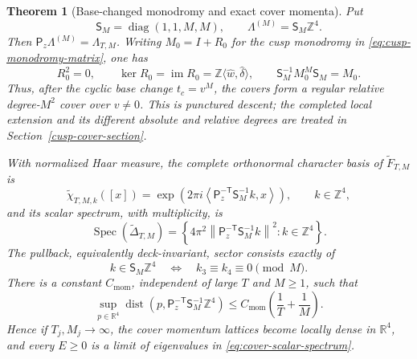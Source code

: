 \documentclass[11pt]{article}
\numberwithin{equation}{section}
\newtheorem{theorem}{Theorem}[section]
\theoremstyle{definition}
\theoremstyle{remark}
\newcommand{\R}{\mathbb R}
\newcommand{\Z}{\mathbb Z}
\newcommand{\Spec}{\operatorname{Spec}}
\begin{document}
\begin{theorem}[Base-changed monodromy and exact cover momenta]
\label{thm:cover-momentum}
Put
\begin{equation}\label{eq:cover-index-matrix}
 \mathsf S_M=\operatorname{diag}(1,1,M,M),
 \qquad \Lambda^{(M)}=\mathsf S_M\Z^4.
\end{equation}
Then $\mathsf P_z\Lambda^{(M)}=\Lambda_{T,M}$.  Writing
$M_0=I+R_0$ for the cusp monodromy in
\eqref{eq:cusp-monodromy-matrix}, one has
\begin{equation}\label{eq:cover-monodromy-algebra}
 R_0^2=0,\qquad
 \ker R_0=\operatorname{im}R_0
 =\Z\langle\widehat w,\widehat\delta\rangle,
 \qquad
 \mathsf S_M^{-1}M_0^M\mathsf S_M=M_0.
\end{equation}
Thus, after the cyclic base change $t_c=v^M$, the covers form a regular
relative degree-$M^2$ cover over $v\ne0$.  This is punctured descent; the
completed local extension and its different absolute and relative degrees
are treated in Section~\ref{cusp-cover-section}.

With normalized Haar measure, the complete orthonormal character basis of
$\widetilde F_{T,M}$ is
\begin{equation}\label{eq:cover-characters}
 \widetilde\chi_{T,M,k}([x])
 =\exp\!\left(2\pi i
 \left\langle\mathsf P_z^{-\mathsf T}\mathsf S_M^{-1}k,x\right\rangle
 \right),\qquad k\in\Z^4,
\end{equation}
and its scalar spectrum, with multiplicity, is
\begin{equation}\label{eq:cover-scalar-spectrum}
 \Spec(\widetilde\Delta_{T,M})
 =\left\{4\pi^2
 \left\|\mathsf P_z^{-\mathsf T}\mathsf S_M^{-1}k\right\|^2:
 k\in\Z^4\right\}.
\end{equation}
The pullback, equivalently deck-invariant, sector consists exactly of
\begin{equation}\label{eq:cover-invariant-sector}
 k\in\mathsf S_M\Z^4
 \quad\Longleftrightarrow\quad
 k_3\equiv k_4\equiv0\pmod M.
\end{equation}
There is a constant $C_{\mathrm{mom}}$, independent of large $T$ and
$M\ge1$, such that
\begin{equation}\label{eq:cover-momentum-mesh}
 \sup_{p\in\R^4}\operatorname{dist}\!\left(
 p,\mathsf P_z^{-\mathsf T}\mathsf S_M^{-1}\Z^4\right)
 \le C_{\mathrm{mom}}\left(\frac1T+\frac1M\right).
\end{equation}
Hence if $T_j,M_j\to\infty$, the cover momentum lattices become locally
dense in $\R^4$, and every $E\ge0$ is a limit of eigenvalues in
\eqref{eq:cover-scalar-spectrum}.
\end{theorem}
\end{document}
